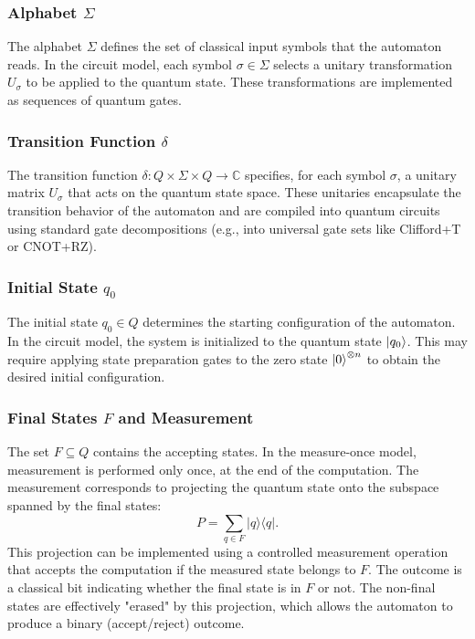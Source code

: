 \subsubsection{Alphabet $\Sigma$}

The alphabet $\Sigma$ defines the set of classical input symbols that the automaton reads. In the circuit model, each symbol $\sigma \in \Sigma$ selects a unitary transformation $U_\sigma$ to be applied to the quantum state. These transformations are implemented as sequences of quantum gates.

\subsubsection{Transition Function $\delta$}

The transition function $\delta: Q \times \Sigma \times Q \to \mathbb{C}$ specifies, for each symbol $\sigma$, a unitary matrix $U_\sigma$ that acts on the quantum state space. These unitaries encapsulate the transition behavior of the automaton and are compiled into quantum circuits using standard gate decompositions (e.g., into universal gate sets like Clifford+T or CNOT+RZ).

\subsubsection{Initial State $q_0$}

The initial state $q_0 \in Q$ determines the starting configuration of the automaton. In the circuit model, the system is initialized to the quantum state $\ket{q_0}$. This may require applying state preparation gates to the zero state $\ket{0}^{\otimes n}$ to obtain the desired initial configuration.

\subsubsection{Final States $F$ and Measurement}

The set $F \subseteq Q$ contains the accepting states. In the measure-once model, measurement is performed only once, at the end of the computation. The measurement corresponds to projecting the quantum state onto the subspace spanned by the final states:
\[
P=\sum_{q\in F} |q\rangle\langle q|.
\]
This projection can be implemented using a controlled measurement operation that accepts the computation if the measured state belongs to $F$. The outcome is a classical bit indicating whether the final state is in $F$ or not. The non-final states are effectively "erased" by this projection, which allows the automaton to produce a binary (accept/reject) outcome.

